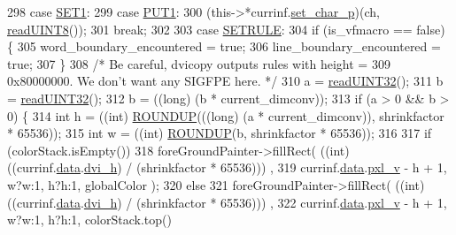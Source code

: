 \begin{DoxyCode}
{298         \textcolor{keywordflow}{case} \hyperlink{dvi_8h_a9d9c3db0b2995020b0d23f67d09dfc88}{SET1}:
299         \textcolor{keywordflow}{case} \hyperlink{dvi_8h_ac2ccc1b9d8eb59ffdd81c958dcedf4b3}{PUT1}:
300           (this->*currinf.\hyperlink{structdrawinf_a365a1c9700846921b83cc69e0f2780c6}{set\_char\_p})(ch, \hyperlink{classbigEndianByteReader_ac5e3b96e3e09b30dbe57175763077c1f}{readUINT8}());
301           \textcolor{keywordflow}{break};
302 
303         \textcolor{keywordflow}{case} \hyperlink{dvi_8h_a4b40fccd7690612d6023471f6a8fe409}{SETRULE}:
304           \textcolor{keywordflow}{if} (is\_vfmacro == \textcolor{keyword}{false}) \{
305             word\_boundary\_encountered = \textcolor{keyword}{true};
306             line\_boundary\_encountered = \textcolor{keyword}{true};
307           \}
308           \textcolor{comment}{/* Be careful, dvicopy outputs rules with height =}
309 \textcolor{comment}{             0x80000000. We don't want any SIGFPE here. */}
310           a = \hyperlink{classbigEndianByteReader_a39c3b90a7617e40cef20796fbc680df8}{readUINT32}();
311           b = \hyperlink{classbigEndianByteReader_a39c3b90a7617e40cef20796fbc680df8}{readUINT32}();
312           b = ((long) (b *  current\_dimconv));
313           \textcolor{keywordflow}{if} (a > 0 && b > 0) \{
314             \textcolor{keywordtype}{int} h = ((int) \hyperlink{xdvi_8h_a20c604ddc8550203707ee1ef509ba365}{ROUNDUP}(((\textcolor{keywordtype}{long}) (a *  current\_dimconv)), shrinkfactor * 65536));
315             \textcolor{keywordtype}{int} w =  ((int) \hyperlink{xdvi_8h_a20c604ddc8550203707ee1ef509ba365}{ROUNDUP}(b, shrinkfactor * 65536));
316 
317             \textcolor{keywordflow}{if} (colorStack.isEmpty())
318               foreGroundPainter->fillRect( ((\textcolor{keywordtype}{int}) ((currinf.\hyperlink{structdrawinf_af73f66288002f0a25c7843a534bf1340}{data}.\hyperlink{structframedata_a530699c241126f99b81cee11c2c1c4e4}{dvi\_h}) / (shrinkfactor * 65536)))
      ,
319                                          currinf.\hyperlink{structdrawinf_af73f66288002f0a25c7843a534bf1340}{data}.\hyperlink{structframedata_a0e7316fa88b0240baa7ce526650131a9}{pxl\_v} - h + 1, w?w:1, h?h:1, globalColor );
320             \textcolor{keywordflow}{else}
321               foreGroundPainter->fillRect( ((\textcolor{keywordtype}{int}) ((currinf.\hyperlink{structdrawinf_af73f66288002f0a25c7843a534bf1340}{data}.\hyperlink{structframedata_a530699c241126f99b81cee11c2c1c4e4}{dvi\_h}) / (shrinkfactor * 65536)))
      ,
322                                         currinf.\hyperlink{structdrawinf_af73f66288002f0a25c7843a534bf1340}{data}.\hyperlink{structframedata_a0e7316fa88b0240baa7ce526650131a9}{pxl\_v} - h + 1, w?w:1, h?h:1, colorStack.top()
}
\end{DoxyCode}
